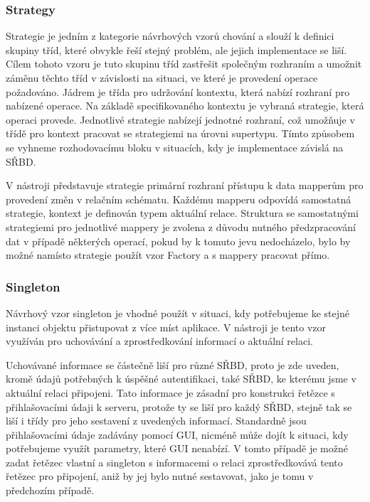 \documentclass[czech,bachelor,public,dept460,male,oneside]{diploma}
\begin{document}
		\subsubsection{Strategy} \label{secStrategy}
		Strategie je jedním z kategorie návrhových vzorů chování a slouží k definici skupiny tříd, které obvykle řeší stejný problém, ale jejich implementace se liší. Cílem tohoto vzoru je tuto skupinu tříd zastřešit společným rozhraním a umožnit záměnu těchto tříd v závislosti na situaci, ve které je provedení operace požadováno. Jádrem je třída pro udržování kontextu, která nabízí rozhraní pro nabízené operace. Na základě specifikovaného kontextu je vybraná strategie, která operaci provede. Jednotlivé strategie nabízejí jednotné rozhraní, což umožňuje v třídě pro kontext pracovat se strategiemi na úrovni supertypu. Tímto způsobem se vyhneme rozhodovacímu bloku v situacích, kdy je implementace závislá na SŘBD.
		
		V nástroji představuje strategie primární rozhraní přístupu k data mapperům pro provedení změn v relačním schématu. Každému mapperu odpovídá samostatná strategie, kontext je definován typem aktuální relace. Struktura se samostatnými strategiemi pro jednotlivé mappery je zvolena z důvodu nutného předzpracování dat v případě některých operací, pokud by k tomuto jevu nedocházelo, bylo by možné namísto strategie použít vzor Factory a s mappery pracovat přímo. 
		
		\subsubsection{Singleton}
		Návrhový vzor singleton je vhodné použít v situaci, kdy potřebujeme ke stejné instanci objektu přistupovat z více míst aplikace. V nástroji je tento vzor využíván pro uchovávání a zprostředkování informací o aktuální relaci. 
		
		Uchovávané informace se částečně liší pro různé SŘBD, proto je zde uveden, kromě údajů potřebných k úspěšné autentifikaci, také SŘBD, ke kterému jsme v aktuální relaci připojeni. Tato informace je zásadní pro konstrukci řetězce s přihlašovacími údaji k serveru, protože ty se liší pro každý SŘBD, stejně tak se liší i třídy pro jeho sestavení z uvedených informací. Standardně jsou přihlašovacími údaje zadávány pomocí GUI, nicméně může dojít k situaci, kdy potřebujeme využít parametry, které GUI nenabízí. V tomto případě je možné zadat řetězec vlastní a singleton s informacemi o relaci zprostředkovává tento řetězec pro připojení, aniž by jej bylo nutné sestavovat, jako je tomu v předchozím případě.
	
\end{document}
